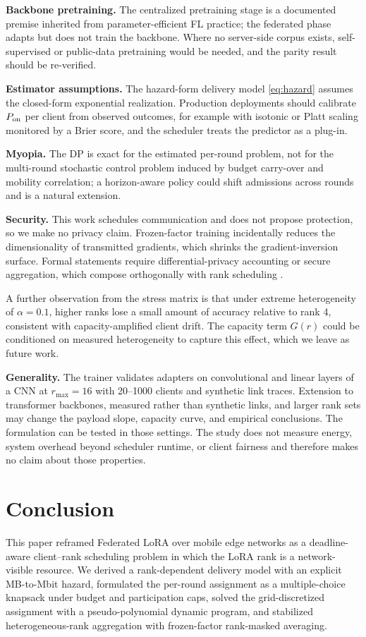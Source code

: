 \documentclass[preprint,12pt]{elsarticle}
\begin{document}
\textbf{Backbone pretraining.} The centralized pretraining stage is a documented premise inherited from parameter-efficient FL practice; the federated phase adapts but does not train the backbone. Where no server-side corpus exists, self-supervised or public-data pretraining would be needed, and the parity result should be re-verified.

\textbf{Estimator assumptions.} The hazard-form delivery model \eqref{eq:hazard} assumes the closed-form exponential realization. Production deployments should calibrate $P_{\rm on}$ per client from observed outcomes, for example with isotonic or Platt scaling monitored by a Brier score, and the scheduler treats the predictor as a plug-in.

\textbf{Myopia.} The DP is exact for the estimated per-round problem, not for the multi-round stochastic control problem induced by budget carry-over and mobility correlation; a horizon-aware policy could shift admissions across rounds and is a natural extension.

\textbf{Security.} This work schedules communication and does not propose protection, so we make no privacy claim. Frozen-factor training incidentally reduces the dimensionality of transmitted gradients, which shrinks the gradient-inversion surface. Formal statements require differential-privacy accounting or secure aggregation, which compose orthogonally with rank scheduling \cite{bonawitz2017secureagg,wei2023pfl_dp}.

A further observation from the stress matrix is that under extreme heterogeneity of $\alpha{=}0.1$, higher ranks lose a small amount of accuracy relative to rank 4, consistent with capacity-amplified client drift. The capacity term $G(r)$ could be conditioned on measured heterogeneity to capture this effect, which we leave as future work.

\textbf{Generality.} The trainer validates adapters on convolutional and linear layers of a CNN at $r_{\max}{=}16$ with 20--1000 clients and synthetic link traces. Extension to transformer backbones, measured rather than synthetic links, and larger rank sets may change the payload slope, capacity curve, and empirical conclusions. The formulation can be tested in those settings. The study does not measure energy, system overhead beyond scheduler runtime, or client fairness and therefore makes no claim about those properties.

\section{Conclusion}
\label{sec:conclusion}
This paper reframed Federated LoRA over mobile edge networks as a deadline-aware client--rank scheduling problem in which the LoRA rank is a network-visible resource. We derived a rank-dependent delivery model with an explicit MB-to-Mbit hazard, formulated the per-round assignment as a multiple-choice knapsack under budget and participation caps, solved the grid-discretized assignment with a pseudo-polynomial dynamic program, and stabilized heterogeneous-rank aggregation with frozen-factor rank-masked averaging.
\end{document}
